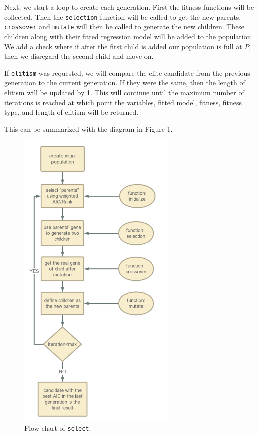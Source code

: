 \documentclass{article}\usepackage[]{graphicx}\usepackage[]{color}
\begin{document}
Next, we start a loop to create each generation. First the fitness functions will be collected. Then the \texttt{selection} function will be called to get the new parents. \texttt{crossover} and \texttt{mutate} will then be called to generate the new children. These children along with their fitted regression model will be added to the population. We add a check where if after the first child is added our population is full at $P$, then we disregard the second child and move on.

If \texttt{elitism} was requested, we will compare the elite candidate from the previous generation to the current generation. If they were the same, then the length of elitism will be updated by 1. This will continue until the maximum number of iterations is reached at which point the variables, fitted model, fitness, fitness type, and length of elitism will be returned.

This can be summarized with the diagram in Figure 1.

\begin{figure}[H]
\centering
\includegraphics[width = 3in]{flow.png}
\caption{Flow chart of \texttt{select}.}
\end{figure}
\end{document}
